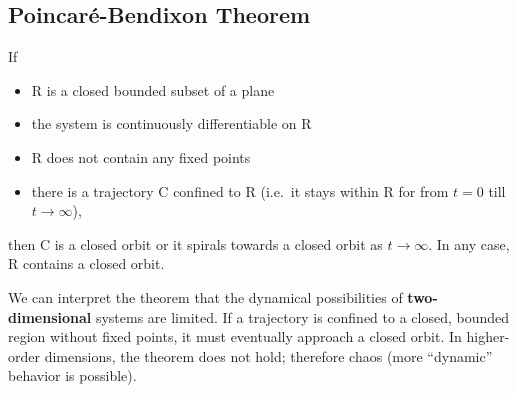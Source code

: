 \subsection{Poincaré-Bendixon Theorem}

If

\begin{itemize}
\item
  R is a closed bounded subset of a plane
\item
  the system is continuously differentiable on R
\item
  R does not contain any fixed points
\item
  there is a trajectory C confined to R (i.e.~it stays within R for from $t=0$ till $t \rightarrow \infty$),
\end{itemize}

then C is a closed orbit or it spirals towards a closed orbit as
$t \rightarrow \infty$. In any case, R contains a closed orbit.

We can interpret the theorem that the dynamical possibilities of \textbf{two- dimensional} systems are limited. If a trajectory is confined to a closed, bounded region without fixed points, it must eventually approach a closed orbit. In higher-order dimensions, the theorem does not hold; therefore chaos (more ``dynamic'' behavior is
possible).
